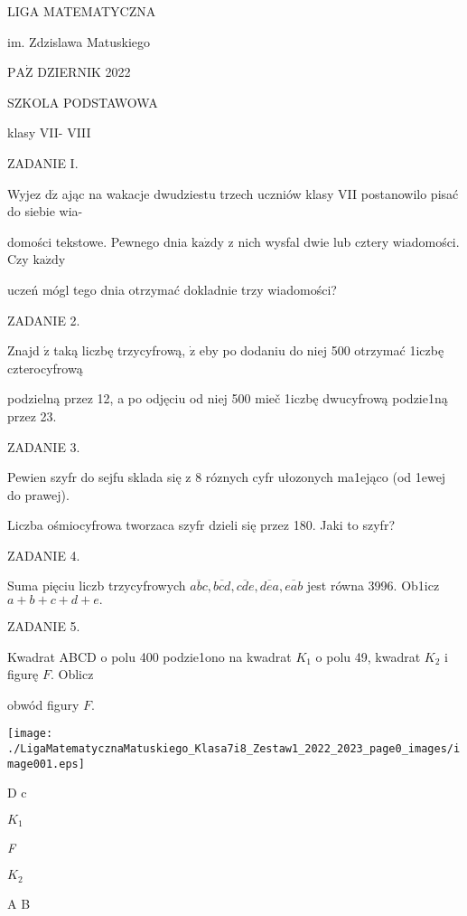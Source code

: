 \documentclass[a4paper,12pt]{article}
\begin{document}
LIGA MATEMATYCZNA

im. Zdzislawa Matuskiego

$\mathrm{P}\mathrm{A}\dot{\mathrm{Z}}$ DZIERNIK 2022

SZKOLA PODSTAWOWA

klasy VII- VIII

ZADANIE I.

Wyjez $\mathrm{d}\dot{\mathrm{z}}$ ając na wakacje dwudziestu trzech uczniów klasy VII postanowilo pisać do siebie wia-

domości tekstowe. Pewnego dnia $\mathrm{k}\mathrm{a}\dot{\mathrm{z}}\mathrm{d}\mathrm{y}$ z nich wysfal dwie lub cztery wiadomości. Czy $\mathrm{k}\mathrm{a}\dot{\mathrm{z}}\mathrm{d}\mathrm{y}$

uczeń mógl tego dnia otrzymać dokladnie trzy wiadomości?

ZADANIE 2.

Znajd $\acute{\mathrm{z}}$ taką liczbę trzycyfrową, $\dot{\mathrm{z}}$ eby po dodaniu do niej 500 otrzymać 1iczbę czterocyfrową

podzielną przez 12, a po odjęciu od niej 500 mieč 1iczbę dwucyfrową podzie1ną przez 23.

ZADANIE 3.

Pewien szyfr do sejfu sklada się z 8 róznych cyfr ułozonych ma1ejąco (od 1ewej do prawej).

Liczba ośmiocyfrowa tworzaca szyfr dzieli się przez 180. Jaki to szyfr?

ZADANIE 4.

Suma pięciu liczb trzycyfrowych $\overline{abc}, \overline{bcd}, \overline{cde}, \overline{dea}, \overline{eab}$ jest równa 3996. Ob1icz $a+b+c+d+e.$

ZADANIE 5.

Kwadrat ABCD o polu 400 podzie1ono na kwadrat $K_{1}$ o polu 49, kwadrat $K_{2}$ i figurę $F$. Oblicz

obwód figury $F.$
\begin{center}
\texttt{[image: ./LigaMatematycznaMatuskiego\_Klasa7i8\_Zestaw1\_2022\_2023\_page0\_images/image001.eps]}
\end{center}
D  c

$K_{1}$

{\it F}

$K_{2}$

A  B
\end{document}
